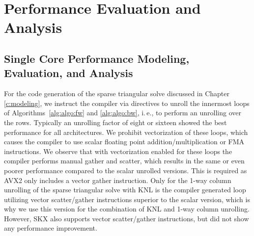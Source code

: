 \chapter{Performance Evaluation and Analysis}
\label{sec:pa}
\label{sec:performance}

\section{Single Core Performance Modeling, Evaluation, and Analysis}
\label{sec:performance:singlecore}

For the code generation
of the sparse triangular solve discussed in Chapter \ref{c:modeling}, we instruct
the compiler via directives to unroll the
innermost loops of Algorithms~\ref{alg:algo:fw} and \ref{alg:algo:bw}, i.\,e.,
to perform an unrolling over the rows.
Typically an unrolling factor of eight or sixteen showed the best
performance for all architectures.
%
We prohibit vectorization of these loops, which causes the
compiler to use scalar floating point addition/multiplication or FMA
instructions.
%
We observe that
with vectorization enabled for these loops the compiler
performs manual gather and scatter, which results in the same or even poorer
performance compared to the scalar unrolled versions.
This is required as AVX2 only includes a vector gather instruction.
%
Only for the 1-way column unrolling of the sparse triangular solve
with KNL is the compiler
generated loop utilizing vector scatter/gather instructions superior to
the scalar version, which is why we use this version for the combination of KNL
and 1-way column unrolling.
However, SKX also supports vector scatter/gather instructions, but did not
show any performance improvement.

